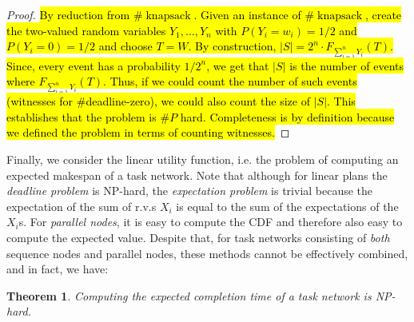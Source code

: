 \documentclass{article}
\newtheorem{theorem}{Theorem}
\begin{document}
\begin{proof} \hl{By reduction from $\#\operatorname{knapsack}
$. Given an instance of $\#\operatorname{knapsack}
$, create the two-valued random variables $Y_{1},\dots,Y_{n} $ with $P(Y_i=w_i)=1/2$ and $P(Y_i=0)=1/2$ and choose $T=W$. By construction, $|S|=2^n \cdot F_{\sum_{i=1}^{n} Y_{i}}(T)$. Since, every event has a probability $1/2^n$, we get that $|S|$ is the number of events where $F_{\sum_{i=1}^{n} Y_{i}}(T)$. Thus, if we could count the number of such events (witnesses for $\#$deadline-zero), we could also count the size of $|S|$. This establishes that the problem is $\#P$ hard. Completeness is by definition because we defined the problem in terms of counting witnesses.}
\end{proof}

Finally, we consider the linear utility function, i.e. the problem
of computing an expected makespan of a task network.
Note that although for linear plans the {\em deadline problem} is NP-hard, the {\em expectation problem} is trivial because the expectation
of the sum of r.v.s $X_i$ is equal to the sum of the expectations of the $X_i$s.
For {\em parallel nodes}, it is easy to compute the CDF and therefore also easy to
compute the expected value.
Despite that, for task networks consisting of {\em  both} sequence nodes and
parallel nodes, these methods cannot be effectively combined, and in fact, we have:
\begin{theorem}
Computing the expected completion time of a task network is NP-hard.
\end{theorem}
\end{document}
